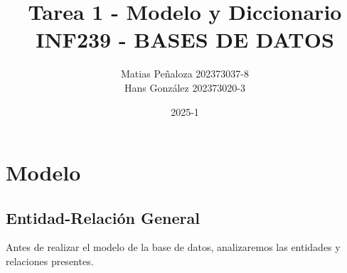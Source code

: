 \documentclass{article}
\begin{document}
\title{
    Tarea 1 - Modelo y Diccionario \\
    INF239 - BASES DE DATOS
}
\author{
    Matias Peñaloza 202373037-8 \\
    Hans González 202373020-3
}
\date{
    2025-1
}
\maketitle

\section{Modelo}
\subsection{Entidad-Relación General}
Antes de realizar el modelo de la base de datos, analizaremos las entidades y relaciones presentes.
\end{document}
